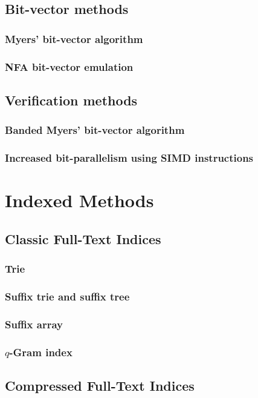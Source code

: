 \section{Bit-vector methods}
\subsection{Myers' bit-vector algorithm}
\subsection{NFA bit-vector emulation}
\section{Verification methods}
\subsection{Banded Myers' bit-vector algorithm}
\subsection{Increased bit-parallelism using SIMD instructions}

\chapter{Indexed Methods}
\section{Classic Full-Text Indices}
\subsection{Trie}
\subsection{Suffix trie and suffix tree}
\subsection{Suffix array}
\subsection{$q$-Gram index}
\section{Compressed Full-Text Indices}
